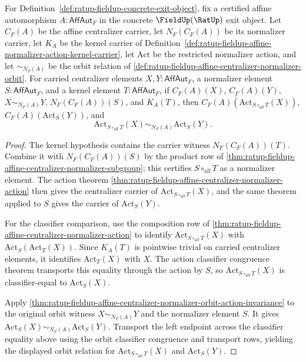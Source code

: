 \begin{theorem}
\label{thm:ratup-fieldup-normalizer-kernel-collapses-orbit-action}
For Definition~\ref{def:ratup-fieldup-concrete-exit-object}, fix a certified
affine automorphism $A:\mathsf{AffAut}_F$ in the concrete $\FieldUp(\RatUp)$
exit object. Let $C_F(A)$ be the affine centralizer carrier, let
$N_F(C_F(A))$ be its normalizer carrier, let $K_A$ be the kernel carrier of
Definition~\ref{def:ratup-fieldup-affine-normalizer-action-kernel-carrier}, let
$\mathrm{Act}$ be the restricted normalizer action, and let
$\sim_{N_F(A)}$ be the orbit relation of
\autoref{def:ratup-fieldup-affine-centralizer-normalizer-orbit}. For carried
centralizer elements $X,Y:\mathsf{AffAut}_F$, a normalizer element
$S:\mathsf{AffAut}_F$, and a kernel element $T:\mathsf{AffAut}_F$, if
$C_F(A)(X)$, $C_F(A)(Y)$, $X\sim_{N_F(A)}Y$, $N_F(C_F(A))(S)$, and $K_A(T)$,
then $C_F(A)(\mathrm{Act}_{S\circ_{\mathrm{aff}}T}(X))$,
$C_F(A)(\mathrm{Act}_S(Y))$, and
$$
\mathrm{Act}_{S\circ_{\mathrm{aff}}T}(X)\sim_{N_F(A)}\mathrm{Act}_S(Y).
$$
\end{theorem}
\begin{proof}
The kernel hypothesis contains the carrier witness $N_F(C_F(A))(T)$. Combine
it with $N_F(C_F(A))(S)$ by the product row of
\autoref{thm:ratup-fieldup-affine-centralizer-normalizer-subgroup}; this
certifies $S\circ_{\mathrm{aff}}T$ as a normalizer element. The action theorem
\autoref{thm:ratup-fieldup-affine-centralizer-normalizer-action} then gives the
centralizer carrier of $\mathrm{Act}_{S\circ_{\mathrm{aff}}T}(X)$, and the same
theorem applied to $S$ gives the carrier of $\mathrm{Act}_S(Y)$.

For the classifier comparison, use the composition row of
\autoref{thm:ratup-fieldup-affine-centralizer-normalizer-action} to identify
$\mathrm{Act}_{S\circ_{\mathrm{aff}}T}(X)$ with
$\mathrm{Act}_S(\mathrm{Act}_T(X))$. Since $K_A(T)$ is pointwise trivial on
carried centralizer elements, it identifies $\mathrm{Act}_T(X)$ with $X$. The
action classifier congruence theorem transports this equality through the
action by $S$, so
$\mathrm{Act}_{S\circ_{\mathrm{aff}}T}(X)$ is classifier-equal to
$\mathrm{Act}_S(X)$.

Apply
\autoref{thm:ratup-fieldup-affine-centralizer-normalizer-orbit-action-invariance}
to the original orbit witness $X\sim_{N_F(A)}Y$ and the normalizer element $S$.
It gives $\mathrm{Act}_S(X)\sim_{N_F(A)}\mathrm{Act}_S(Y)$. Transport the left
endpoint across the classifier equality above using the orbit classifier
congruence and transport rows, yielding the displayed orbit relation for
$\mathrm{Act}_{S\circ_{\mathrm{aff}}T}(X)$ and $\mathrm{Act}_S(Y)$.
\end{proof}

